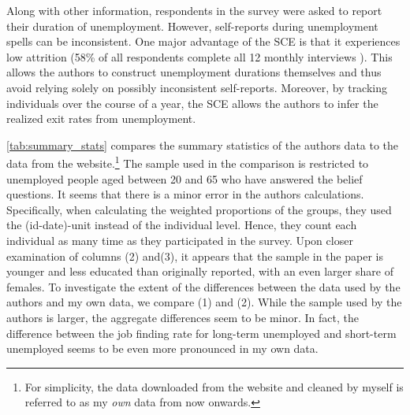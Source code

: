 \documentclass[11pt,a4paper,leqno]{article}
\begin{document}
Along with other information, respondents in the survey were asked to report their duration of unemployment. However, self-reports during unemployment spells can be inconsistent.  One major advantage of the SCE is that it experiences low attrition (58\% of all respondents complete all 12 monthly interviews \parencite{SCEOverview}). This allows the authors to construct unemployment durations themselves and thus avoid relying solely on possibly inconsistent self-reports.  Moreover, by tracking individuals over the course of a year, the SCE allows the authors to infer the realized exit rates from unemployment. 
 
     \begin{table}[!htbp] 
 	\centering 
 	\caption{Summary Statistics} 
 	\label{tab:summary_stats} 
 	
 	\begin{minipage}[center]{0.7\textwidth}
 		\caption*{\footnotesize \textbf{Notes:} Survey weights are used for all calculations. (3) replicates the reported statistics from the paper exactly. (2) corrects for the error reported in the text and (1) is displaying the summary statistics for the SCE sample.}
 	\end{minipage}
 \end{table}
 
 \autoref{tab:summary_stats} compares the summary statistics of the authors data to the data from the website.\footnote{
 	For simplicity, the data downloaded from the website and cleaned by myself is referred to as my \textit{own} data from now onwards. }  The sample used in the comparison is restricted to unemployed people aged between 20 and 65 who have answered the belief questions. 
 It seems that there is a minor error in the authors calculations. Specifically, when calculating the weighted proportions of the groups, they used the (id-date)-unit instead of the individual level. Hence, they count each individual as many time as they participated in the survey. Upon closer examination of columns (2) and(3), it appears that the sample in the paper is younger and less educated than originally reported, with an even larger share of females. To investigate the extent of the differences between the data used by the authors and my own data, we compare (1) and (2). While the sample used by the authors is larger, the aggregate differences seem to be minor. In fact, the difference between the job finding rate for long-term unemployed and short-term unemployed seems to be even more pronounced in my own data.  
\end{document}
